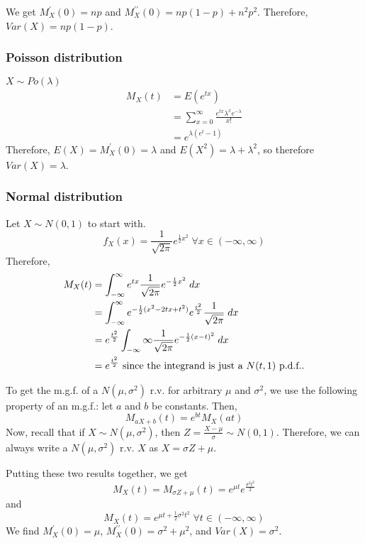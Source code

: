 \documentclass[12pt]{article}
\begin{document}
We get $M_X^{\prime} (0) = np$ and $M_X^{\prime \prime} (0) = np(1-p) + n^2 p^2$. Therefore, $Var(X) = np(1-p)$.

\subsubsection{Poisson distribution}
$X \sim Po(\lambda)$
\begin{align*}
    M_X (t) &= E(e^{tx}) \\
        &= \sum_{x=0}^{\infty} \frac{e^{tx} \lambda^x e^{-\lambda}}{x!} \\
        &= e^{\lambda (e^t - 1)}
\end{align*}
Therefore, $E(X) = M_X^{\prime} (0) = \lambda$ and $E(X^2) = \lambda + \lambda^2$, so therefore $Var(X) = \lambda$.

\subsubsection{Normal distribution}
Let $X \sim N(0,1)$ to start with. 
\[
    f_X (x) = \frac{1}{\sqrt{2 \pi}} e^{\frac{1}{2} x^2} \; \forall x \in (-\infty, \infty)
\]
Therefore,
\begin{align*}
    M_X (t) &= \int_{-\infty}^{\infty} e^{tx} \frac{1}{\sqrt{2 \pi}} e^{-\frac{1}{2} x^2} \; dx \\
        &= \int_{-\infty}^{\infty} e^{-\frac{1}{2} (x^2 - 2tx + t^2)} e^{\frac{t^2}{2}} \frac{1}{\sqrt{2\pi}} \; dx \\
        &= e^{\frac{t^2}{2}} \int_{-\infty}{\infty} \frac{1}{\sqrt{2\pi}} e^{-\frac{1}{2} (x-t)^2} \; dx \\
        &= e^{\frac{t^2}{2}} \textnormal{ since the integrand is just a $N(t,1)$ p.d.f..}
\end{align*}

To get the m.g.f. of a $N(\mu, \sigma^2)$ r.v. for arbitrary $\mu$ and $\sigma^2$, we use the following property of an m.g.f.: let $a$ and $b$ be constants. Then,
\[
    M_{aX + b} (t) = e^{bt} M_X (at)
\]
Now, recall that if $X \sim N(\mu, \sigma^2)$, then $Z = \frac{X-\mu}{\sigma} \sim N(0,1)$. Therefore, we can always write a $N(\mu, \sigma^2)$ r.v. $X$ as $X = \sigma Z + \mu$.

Putting these two results together, we get
\[
    M_X (t) = M_{\sigma Z + \mu} (t) = e^{\mu t} e^{\frac{\sigma^2 t^2}{2}}
\]
and
\[
    M_X (t) = e^{\mu t + \frac{1}{2} \sigma^2 t^2} \; \forall t \in (-\infty, \infty)
\]
We find $M_X^{\prime} (0) = \mu$, $M_X^{\prime \prime} (0) = \sigma^2 + \mu^2$, and $Var(X) = \sigma^2$.
\end{document}
